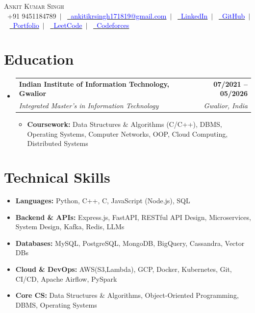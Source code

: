 \documentclass[letterpaper,11pt]{article}
\makeatletter
\newcommand{\resumeItem}[1]{
  \item\normalsize{#1 \vspace{-3pt}}
}
\newcommand{\resumeSubheading}[4]{
  \vspace{-2pt}\item
    \begin{tabular*}{1.0\textwidth}[t]{l@{\extracolsep{\fill}}r}
      \textbf{#1} & \textbf{#2} \\
      \textit{#3} & \textit{#4} \\
    \end{tabular*}\vspace{-6pt}
}
\newcommand{\resumeSubHeadingListStart}{\begin{itemize}[leftmargin=0.0in, label={}]}
\newcommand{\resumeSubHeadingListEnd}{\end{itemize}\vspace{-6pt}}
\newcommand{\resumeItemListStart}{\begin{itemize}[leftmargin=0.15in, topsep=0pt, itemsep=0pt, parsep=0pt]}
\newcommand{\resumeItemListEnd}{\end{itemize}\vspace{-5pt}}
\makeatother
\begin{document}

\begin{center}
  \vspace{-5pt}
  {\Huge \scshape Ankit Kumar Singh} \\ \vspace{3pt}
  \footnotesize 
  \raisebox{-0.1\height}\faPhone\ +91 9451184789~$|$~%
  \href{mailto:ankitkrsingh171819@gmail.com}{\raisebox{-0.2\height}{\faEnvelope}\ \textcolor{blue}{ankitikrsingh171819@gmail.com}}~$|$~%
  \href{https://linkedin.com/in/ankit-kumar-singh-37450422a}{\raisebox{-0.2\height}\faLinkedin\ \textcolor{blue}{LinkedIn}}~$|$~%
  \href{https://github.com/codexankitsingh}{\raisebox{-0.2\height}\faGithub\ \textcolor{blue}{GitHub}}~$|$~%
  \href{https://ankitsingh.space/}{\raisebox{-0.2\height}\faGlobe\ \textcolor{blue}{Portfolio}}~$|$~%
  \href{https://leetcode.com/u/_Ankitkumarsingh/}{\raisebox{-0.2\height}\faCode\ \textcolor{blue}{LeetCode}}~$|$~%
  \href{https://codeforces.com/profile/ankitmwd1501}{\raisebox{-0.2\height}\faTrophy\ \textcolor{blue}{Codeforces}}
\end{center}

\vspace{-16pt}

\section{Education}
\resumeSubHeadingListStart
  \resumeSubheading
    {Indian Institute of Information Technology, Gwalior}{07/2021 -- 05/2026}
    {Integrated Master's in Information Technology }{Gwalior, India}
  \resumeItemListStart
    \resumeItem{\textbf{Coursework:} Data Structures \& Algorithms (C/C++), DBMS, Operating Systems, Computer Networks, OOP, Cloud Computing, Distributed Systems}
  \resumeItemListEnd
\resumeSubHeadingListEnd

\section{Technical Skills}
\begin{itemize}[leftmargin=0.15in, topsep=1pt, itemsep=0pt, parsep=0pt]
  \item\normalsize \textbf{Languages:} Python, C++, C, JavaScript (Node.js), SQL
  \item\normalsize \textbf{Backend \& APIs:} Express.js, FastAPI, RESTful API Design, Microservices, System Design, Kafka, Redis, LLMs
  \item\normalsize \textbf{Databases:} MySQL, PostgreSQL, MongoDB, BigQuery, Cassandra, Vector DBs
  \item\normalsize \textbf{Cloud \& DevOps:} AWS(S3,Lambda), GCP, Docker, Kubernetes, Git, CI/CD, Apache Airflow, PySpark
  \item\normalsize \textbf{Core CS:} Data Structures \& Algorithms, Object-Oriented Programming, DBMS, Operating Systems
\end{itemize}
\vspace{-15pt}
\end{document}
